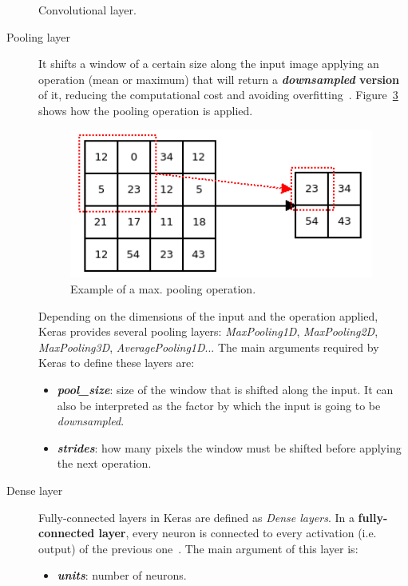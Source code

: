 \begin{description}
\begin{figure}
\begin{subfigure}{0.7\textwidth}
			\caption{}\label{fig:conv_b}
		\end{subfigure}
		\caption{Convolutional layer.}
		\label{fig:convlayer}
	\end{figure}
	
\end{description}

\begin{description}
	\item[{Pooling layer}] It shifts a window of a certain size along the input image applying an operation (mean or maximum) that will return a \textbf{\textit{downsampled} version} of it, reducing the computational cost and avoiding overfitting~\cite{Scherer2010Evaluation}. Figure~\ref{fig:pooling} shows how the pooling operation is applied.

	\begin{figure}
		\centering
		\includegraphics[width=10cm, keepaspectratio]{figures/pooling.png}
		\caption{Example of a max. pooling operation.}
		\label{fig:pooling}
	\end{figure}
	
	Depending on the dimensions of the input and the operation applied, Keras provides several pooling layers: \textit{MaxPooling1D}, \textit{MaxPooling2D}, \textit{MaxPooling3D}, \textit{AveragePooling1D}... The main arguments required by Keras to define these layers are:
	\begin{itemize}
		\item \textbf{\textit{pool\_size}}: size of the window that is shifted along the input. It can also be interpreted as the factor by which the input is going to be \textit{downsampled}.
		\item \textbf{\textit{strides}}: how many pixels the window must be shifted before applying the next operation.
	\end{itemize}
\end{description}

\begin{description}
	\item[Dense layer] Fully-connected layers in Keras are defined as \textit{Dense layers}. In a \textbf{fully-connected layer}, every neuron is connected to every activation (i.e. output) of the previous one~\cite{cs231n}. The main argument of this layer is:
	\begin{itemize}
		\item \textbf{\textit{units}}: number of neurons.
	\end{itemize} 
\end{description}

